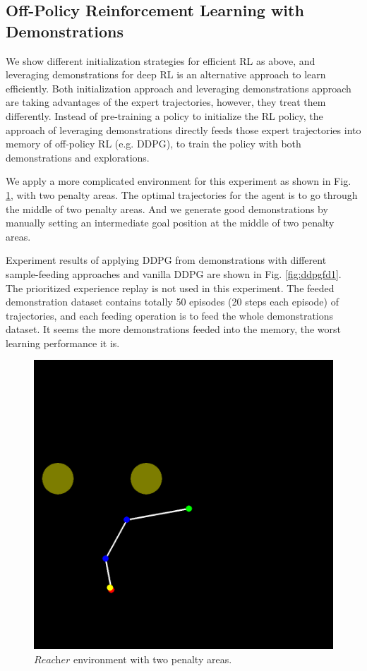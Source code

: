 \documentclass{article}
\begin{document}
\subsection{Off-Policy Reinforcement Learning with Demonstrations}
We show different initialization strategies for efficient RL as above, and leveraging demonstrations for deep RL is an alternative approach to learn efficiently. Both initialization approach and leveraging demonstrations approach are taking advantages of the expert trajectories, however, they treat them differently. Instead of pre-training a policy to initialize the RL policy, the approach of leveraging demonstrations directly feeds those expert trajectories into memory of off-policy RL (e.g. DDPG), to train the policy with both demonstrations and explorations.

We apply a more complicated environment for this experiment as shown in Fig. \ref{fig:ddpgfd0}, with two penalty areas. The optimal trajectories for the agent is to go through the middle of two penalty areas. And we generate good demonstrations by manually setting an intermediate goal position at the middle of two penalty areas.

Experiment results of applying DDPG from demonstrations with different sample-feeding approaches and vanilla DDPG are shown in Fig. \ref{fig:ddpgfd1}.  The prioritized experience replay is not used in this experiment. The feeded demonstration dataset contains totally 50 episodes (20 steps each episode) of trajectories, and each feeding operation is to feed the whole demonstrations dataset. It seems the more demonstrations feeded into the memory, the worst learning performance it is.
\begin{figure}[htbp]
	\centering
	\includegraphics[scale=0.3]{img/ddpgfd_env.png}
	\caption{$\textit{Reacher}$ environment with two penalty areas.}
	\label{fig:ddpgfd0}
\end{figure}
\end{document}
